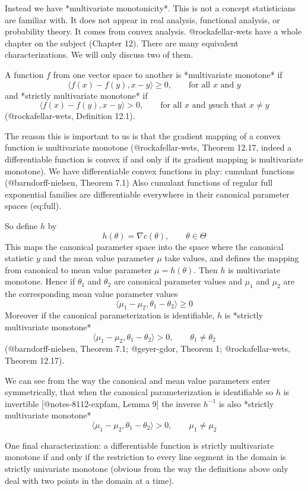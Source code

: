 \documentclass[11pt]{article}
\begin{document}
Instead we have *multivariate monotonicity*.
This is not a concept statisticians are familiar with.
It does not appear in real analysis, functional analysis,
or probability theory.
It comes from convex analysis.
@rockafellar-wets have a whole chapter on the
subject (Chapter 12).  There are many equivalent characterizations.
We will only discuss two of them.

A function $f$ from one vector space to another is *multivariate monotone* if
$$
   \langle f(x) - f(y), x - y \rangle \ge 0, \qquad \text{for all $x$ and $y$}
$$
and *strictly multivariate monotone* if
$$
   \langle f(x) - f(y), x - y \rangle > 0, \qquad \text{for all $x$ and $y$
   such that $x \neq y$}
$$
(@rockafellar-wets, Definition 12.1).

The reason this is important to us is that the gradient mapping of
a convex function is multivariate monotone (@rockafellar-wets,
Theorem 12.17, indeed a differentiable function is convex
if and only if its gradient mapping is multivariate monotone).
We have differentiable convex functions in play: cumulant functions
(@barndorff-nielsen, Theorem 7.1)
Also cumulant functions of regular full exponential families are
differentiable everywhere in their canonical parameter spaces \@ref(eq:full).

So define $h$ by
$$
   h(\theta) = \nabla c(\theta), \qquad \theta \in \Theta
$$
This maps the canonical parameter space into the space where the canonical
statistic $y$ and the mean value parameter $\mu$ take values, and defines
the mapping from canonical to mean value parameter $\mu = h(\theta)$.
Then $h$ is multivariate monotone.
Hence if $\theta_1$ and $\theta_2$ are canonical parameter values
and $\mu_1$ and $\mu_2$ are the corresponding mean value parameter values
$$
   \langle \mu_1 - \mu_2, \theta_1 - \theta_2 \rangle \ge 0
$$
Moreover if the canonical parameterization is identifiable, $h$ is
*strictly multivariate monotone*
$$
   \langle \mu_1 - \mu_2, \theta_1 - \theta_2 \rangle > 0,
   \qquad \theta_1 \neq \theta_2
$$
(@barndorff-nielsen, Theorem 7.1; @geyer-gdor, Theorem 1; @rockafellar-wets,
Theorem 12.17).

We can see from the way the canonical and mean value parameters
enter symmetrically, that when the canonical parameterization is identifiable
so $h$ is invertible [@notes-8112-expfam, Lemma 9] the
inverse $h^{- 1}$ is also *strictly multivariate monotone*
$$
   \langle \mu_1 - \mu_2, \theta_1 - \theta_2 \rangle > 0,
   \qquad \mu_1 \neq \mu_2
$$

One final characterization: a differentiable function is
strictly multivariate monotone if and only if the restriction
to every line segment in the domain is strictly univariate monotone
(obvious from the way the definitions above only deal with two points
in the domain at a time).
\end{document}
